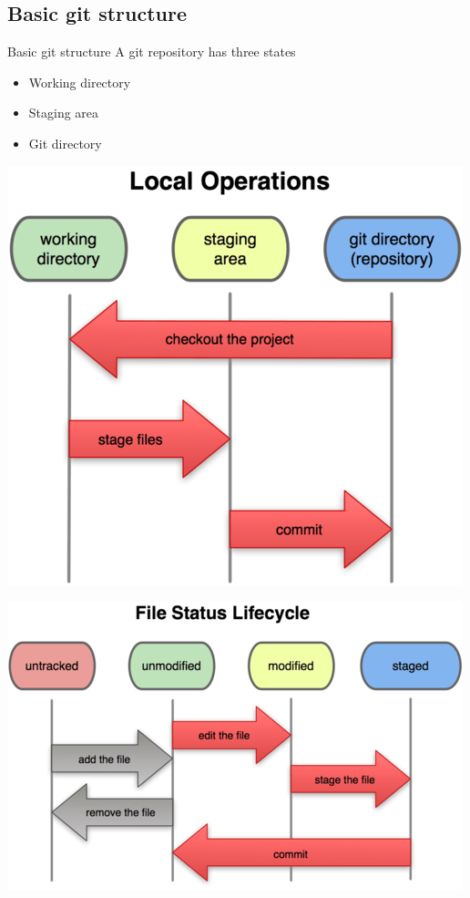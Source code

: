 \documentclass[10pt,a4paper]{beamer}
\begin{document}
\subsection{Basic git structure}
\begin{frame}{Basic git structure}
A git repository has three states
\begin{itemize}
\item Working directory
\item Staging area
\item Git directory
\end{itemize}
\end{frame}

\begin{frame}[plain]
\includegraphics[width=\linewidth]{threeStates.png}
\end{frame}

\begin{frame}[plain]
\includegraphics[width=\linewidth]{fileLifeCycle.png}
\end{frame}
\end{document}
